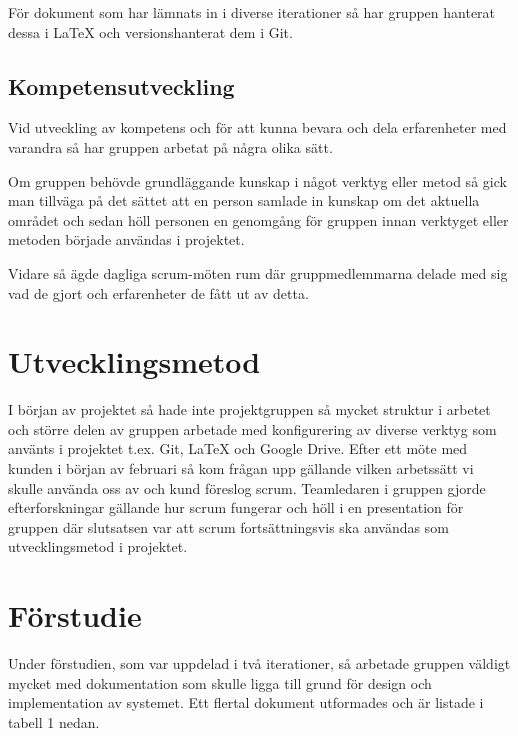 För dokument som har lämnats in i diverse iterationer så har gruppen hanterat dessa i LaTeX och versionshanterat dem i Git.

\subsection{Kompetensutveckling}
Vid utveckling av kompetens och för att kunna bevara och dela erfarenheter med varandra så har gruppen arbetat på några olika sätt.

Om gruppen behövde grundläggande kunskap i något verktyg eller metod så gick man tillväga på det sättet att en person samlade in kunskap om det aktuella området och sedan höll personen en genomgång för gruppen innan verktyget eller metoden började användas i projektet.

Vidare så ägde dagliga scrum-möten rum där gruppmedlemmarna delade med sig vad de gjort och erfarenheter de fått ut av detta.

\section{Utvecklingsmetod}
I början av projektet så hade inte projektgruppen så mycket struktur i arbetet och större delen av gruppen arbetade med konfigurering av diverse verktyg som använts i projektet t.ex. Git, LaTeX och Google Drive.
Efter ett möte med kunden i början av februari så kom frågan upp gällande vilken arbetssätt vi skulle använda oss av och kund föreslog scrum. Teamledaren i gruppen gjorde efterforskningar gällande hur scrum fungerar och höll i en presentation för gruppen där slutsatsen var att scrum fortsättningsvis ska användas som utvecklingsmetod i projektet.

\section{Förstudie}
\label{sec:forstudie}
Under förstudien, som var uppdelad i två iterationer, så arbetade gruppen väldigt mycket med dokumentation som skulle ligga till grund för design och implementation av systemet. Ett flertal dokument utformades och är listade i tabell 1 nedan.

